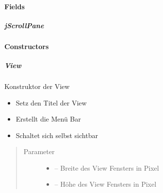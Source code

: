 \documentclass[letterpaper,10pt,ngerman]{sphinxmanual}
\begin{document}
\paragraph{Fields}
\label{\detokenize{com/linuxluigi/edu/view/View:fields}}

\subparagraph{jScrollPane}
\label{\detokenize{com/linuxluigi/edu/view/View:jscrollpane}}

\begin{fulllineitems}
\label{\detokenize{com/linuxluigi/edu/view/View:com.linuxluigi.edu.view.View.jScrollPane}}
\end{fulllineitems}



\paragraph{Constructors}
\label{\detokenize{com/linuxluigi/edu/view/View:constructors}}

\subparagraph{View}
\label{\detokenize{com/linuxluigi/edu/view/View:id1}}

\begin{fulllineitems}
\label{\detokenize{com/linuxluigi/edu/view/View:com.linuxluigi.edu.view.View.View(int, int)}}
Konstruktor der View
\begin{itemize}
\item {} 
Setz den Titel der View

\item {} 
Erstellt die Menü Bar

\item {} 
Schaltet sich selbst sichtbar

\end{itemize}
\begin{quote}\begin{description}
\item[{Parameter}] \leavevmode\begin{itemize}
\item {} 
 -- Breite des View Fensters in Pixel

\item {} 
 -- Höhe des View Fensters in Pixel

\end{itemize}

\end{description}\end{quote}

\end{fulllineitems}
\end{document}
